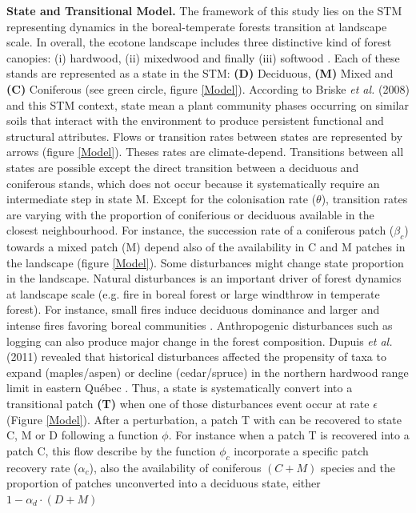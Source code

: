 \textbf{State and Transitional Model.} The framework of this study lies on the
STM representing dynamics in the boreal-temperate forests transition at
landscape scale.  In overall, the ecotone landscape includes three distinctive
kind of forest canopies: (i) hardwood, (ii) mixedwood and finally (iii)
softwood \cite{Fisichelli2013}. Each of these stands are represented as a
state in the STM: \textbf{(D)} Deciduous, \textbf{(M)} Mixed and \textbf{(C)}
Coniferous (see green circle, figure \ref{Model}). According to Briske\textit{
et al.} (2008) and this STM context, state mean a plant community phases
occurring on similar soils that interact with the environment to produce
persistent functional and structural attributes. Flows or transition rates
between states are represented by arrows (figure \ref{Model}). Theses rates
are climate-depend. Transitions between all states are possible  except the
direct transition between a deciduous and coniferous stands, which does not
occur because it systematically require an intermediate step in state M.
Except for the colonisation rate ($\theta$), transition rates are varying with
the proportion of coniferious or deciduous available in the closest
neighbourhood. For instance, the succession rate of a coniferous patch
($\beta_c$) towards a mixed patch (M) depend also of the availability in C and
M patches in the landscape (figure \ref{Model}). Some disturbances might
change state proportion in the landscape. Natural disturbances is an important
driver of forest dynamics at landscape scale (e.g. fire in boreal forest or
large windthrow in temperate forest). For instance, small fires induce
deciduous dominance and larger and intense fires favoring boreal communities
\cite{Bergeron2004}. Anthropogenic disturbances such as logging can also
produce major change in the forest composition. Dupuis \textit{et al.} (2011)
revealed that historical disturbances affected the propensity of taxa to
expand (maples/aspen) or decline (cedar/spruce) in the northern hardwood range
limit in eastern Québec \cite{Dupuis2011}. Thus, a state is systematically
convert into a transitional patch \textbf{(T)} when one of those disturbances
event occur at rate $\epsilon$ (Figure \ref{Model}). After a perturbation, a
patch T with can be recovered to state C, M or D following a function $\phi$.
For instance when a patch T is recovered into a patch C, this flow describe by
the function $\phi_c$ incorporate a specific patch recovery rate ($\alpha_c$),
also the availability of coniferous $(C + M)$ species and the proportion of
patches unconverted into a deciduous state, either $1- \alpha_d \cdot (D + M)$

